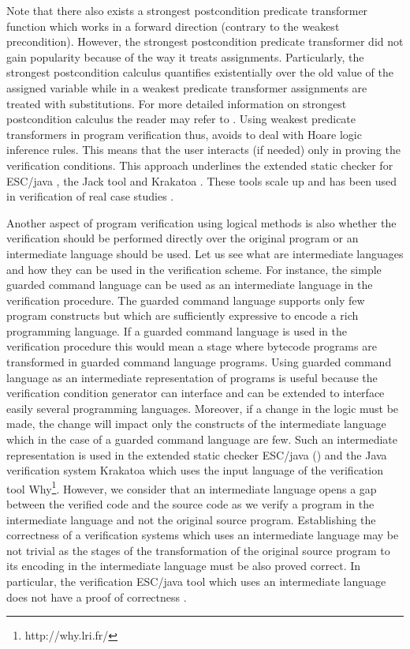  Note that there also exists a strongest postcondition predicate transformer function which works in a forward direction 
 (contrary to the weakest precondition). However, the strongest postcondition predicate transformer
 did not gain popularity because of  the way it treats assignments. Particularly, the strongest postcondition calculus
 quantifies  existentially over the old value
 of the assigned variable while in a weakest predicate transformer assignments are treated with  substitutions.
For more detailed information on strongest postcondition calculus the reader may refer to  \cite{WPCDS}.
Using weakest predicate transformers in program verification thus, avoids to deal with Hoare logic inference rules. 
 This means that the user
 interacts (if needed) only in proving the verification conditions. 
This approach underlines the extended static checker for ESC/java \cite{escjava}, 
 the Jack tool \cite{BRL-JACK} and Krakatoa \cite{marche03krakatoa}. 
These tools scale up and has been used in verification of real case studies \cite{HuismanJB01,BBCGHLPR06:FMCO,jacobs04amast}.

Another aspect of program verification using logical methods is also whether the verification should be performed directly over the original program
or  an intermediate language should be used. Let us see what are intermediate languages and how they can be used in the verification scheme.
For instance, the simple guarded command language can be used as an intermediate language in the verification procedure.
 The guarded command   language supports  only few program constructs but which are 
sufficiently expressive to encode a rich programming language. 
If a guarded command language is used in the verification procedure this would mean 
a stage where  bytecode programs are transformed in guarded command language programs.
Using guarded command language as an intermediate representation of programs
is useful because the verification condition generator can interface and can be extended to interface 
easily several programming languages. Moreover, if a change in the logic must be made, the change will impact only
 the constructs of the intermediate language which in the case of a guarded command language are few.
Such an intermediate representation is used in the extended static checker
ESC/java (\cite{escjava}) and the Java verification system Krakatoa \cite{marche03krakatoa} which uses the input language of the verification tool Why\footnote{http://why.lri.fr/}.
However, we consider that an intermediate language 
opens a gap between  the verified code and the source code as we verify  a program in the intermediate language and not the original source program.
Establishing the correctness of a verification systems which uses an intermediate language
may be not trivial as the stages of the transformation of the original source program to its encoding in the intermediate language must be also proved correct. 
In particular, the verification ESC/java tool which uses an intermediate language does not have a proof of correctness \cite{FLL02ESC}.

